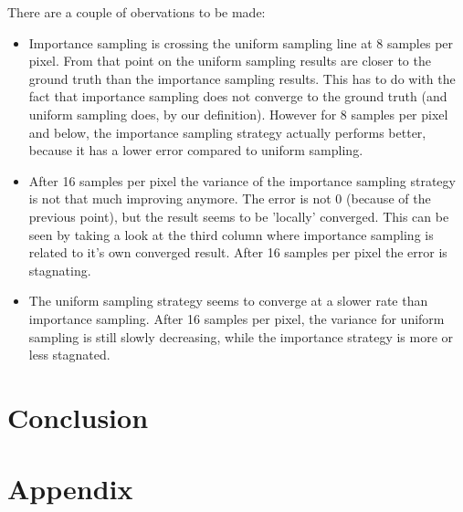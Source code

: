 \documentclass[11pt,a4paper]{report}
\begin{document}
There are a couple of obervations to be made:
\begin{itemize}

\item Importance sampling is crossing the uniform sampling line at 8 samples per pixel. From that point on the uniform sampling results are closer to the ground truth than the importance sampling results. This has to do with the fact that importance sampling does not converge to the ground truth (and uniform sampling does, by our definition). However for 8 samples per pixel and below, the importance sampling strategy actually performs better, because it has a lower error compared to uniform sampling.

\item After 16 samples per pixel the variance of the importance sampling strategy is not that much improving anymore. The error is not 0 (because of the previous point), but the result seems to be 'locally' converged. This can be seen by taking a look at the third column where importance sampling is related to it's own converged result. After 16 samples per pixel the error is stagnating.

\item The uniform sampling strategy seems to converge at a slower rate than importance sampling. After 16 samples per pixel, the variance for uniform sampling is still slowly decreasing, while the importance strategy is more or less stagnated.


\end{itemize}


\chapter{Conclusion}

\chapter{Appendix}



\end{document}
